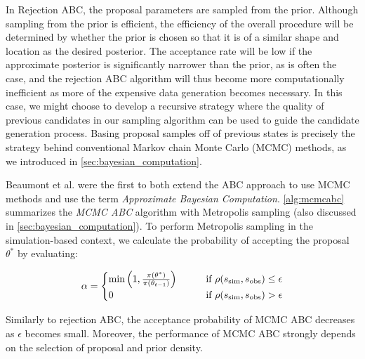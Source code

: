 In Rejection ABC, the proposal parameters are sampled from the prior. Although sampling from the prior is efficient, the efficiency of the overall procedure will be determined by whether the prior is chosen so that it is of a similar shape and location as the desired posterior. The acceptance rate will be low if the approximate posterior is significantly narrower than the prior, as is often the case, and the rejection ABC algorithm will thus become more computationally inefficient as more of the expensive data generation becomes necessary. In this case, we might choose to develop a recursive strategy where the quality of previous candidates in our sampling algorithm can be used to guide the candidate generation process. Basing proposal samples off of previous states is precisely the strategy behind conventional Markov chain Monte Carlo (MCMC) methods, as we introduced in \cref{sec:bayesian_computation}. 

Beaumont et al. \cite{Beaumont} were the first to both extend the ABC approach to use MCMC methods and use the term \textit{Approximate Bayesian Computation}. \cref{alg:mcmcabc} summarizes the \textit{MCMC ABC} algorithm with Metropolis sampling (also discussed in \cref{sec:bayesian_computation}). To perform Metropolis sampling in the simulation-based context, we calculate the probability of accepting the proposal $\theta^*$ by evaluating: 

\begin{equation}\label{eq:abc_metropolis}
    \alpha = \begin{cases}
    \min \qty(1, \frac{\pi \qty(\theta^*)}{\pi \qty(\theta_{t-1})}) \qquad &\text{if } \rho \qty(s_\mathrm{sim}, s_\mathrm{obs}) \leq \epsilon 
    \\
    0 \qquad &\text{if } \rho \qty(s_\mathrm{sim}, s_\mathrm{obs}) > \epsilon 
    \end{cases}
\end{equation}

Similarly to rejection ABC, the acceptance probability of MCMC ABC decreases as $\epsilon$ becomes small. Moreover, the performance of MCMC ABC strongly depends on the selection of proposal and prior density. 

